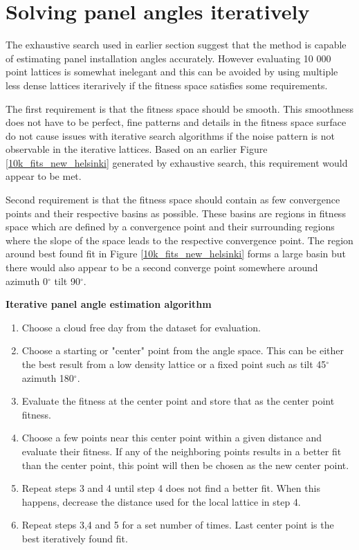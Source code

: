 \newpage

\clearpage

\section{Solving panel angles iteratively}
The exhaustive search used in earlier section suggest that the method is capable of estimating panel installation angles accurately. However evaluating 10 000 point lattices is somewhat inelegant and this can be avoided by using multiple less dense lattices iterarively if the fitness space satisfies some requirements.

The first requirement is that the fitness space should be smooth. This smoothness does not have to be perfect, fine patterns and details in the fitness space surface do not cause issues with iterative search algorithms if the noise pattern is not observable in the iterative lattices. Based on an earlier Figure \ref{10k_fits_new_helsinki} generated by exhaustive search, this requirement would appear to be met.

Second requirement is that the fitness space should contain as few convergence points and their respective basins as possible. These basins are regions in fitness space which are defined by a convergence point and their surrounding regions where the slope of the space leads to the respective convergence point. The region around best found fit in Figure \ref{10k_fits_new_helsinki} forms a large basin but there would also appear to be a second converge point somewhere around azimuth 0$^\circ$ tilt 90$^\circ$.

 

\noindent \textbf{Iterative panel angle estimation algorithm}
\begin{enumerate}
	\item Choose a cloud free day from the dataset for evaluation.
  \item Choose a starting or "center" point from the angle space. This can be either the best result from a low density lattice or a fixed point such as tilt 45$^\circ$ azimuth 180$^\circ$.
  \item Evaluate the fitness at the center point and store that as the center point fitness.
  \item Choose a few points near this center point within a given distance and evaluate their fitness. If any of the neighboring points results in a better fit than the center point, this point will then be chosen as the new center point.
  \item Repeat steps 3 and 4 until step 4 does not find a better fit. When this happens, decrease the distance used for the local lattice in step 4.
  \item Repeat steps 3,4 and 5 for a set number of times. Last center point is the best iteratively found fit.
\end{enumerate}


